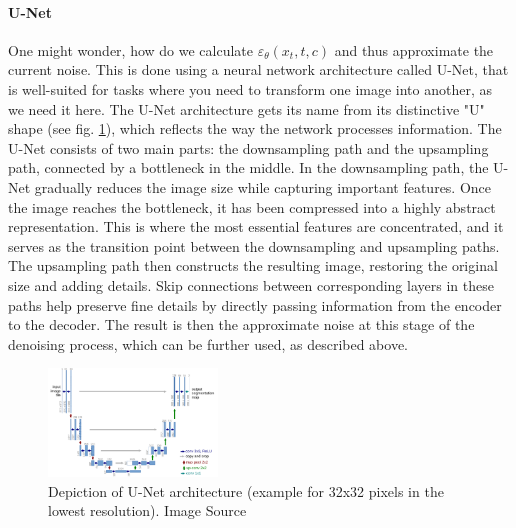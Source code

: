 \documentclass[11pt]{article}
\begin{document}
\paragraph{U-Net}
One might wonder, how do we calculate $\varepsilon_\theta(x_t,t,c)$ and thus approximate the current noise. This is done using a neural network architecture called U-Net\cite{ronneberger2015unetconvolutionalnetworksbiomedical}, that is well-suited for tasks where you need to transform one image into another, as we need it here.
The U-Net architecture gets its name from its distinctive "U" shape (see fig. \ref{fig:unet}), which reflects the way the network processes information. The U-Net consists of two main parts: the downsampling path  and the upsampling path, connected by a bottleneck in the middle.
In the downsampling path, the U-Net gradually reduces the image size while capturing important features. Once the image reaches the bottleneck, it has been compressed into a highly abstract representation. This is where the most essential features are concentrated, and it serves as the transition point between the downsampling and upsampling paths. The upsampling path then constructs the resulting image, restoring the original size and adding details. Skip connections between corresponding layers in these paths help preserve fine details by directly passing information from the encoder to the decoder.
The result is then the approximate noise at this stage of the denoising process, which can be further used, as described above.

\begin{figure}[h]
    \centering
    \includegraphics[width=0.4\textwidth]{assets/u-net-illustration-correct-scale2.pdf}
    \caption{Depiction of U-Net architecture (example for 32x32 pixels in the lowest resolution). Image Source \cite{ronneberger2015unetconvolutionalnetworksbiomedical}}
    \label{fig:unet}
\end{figure}
\end{document}
